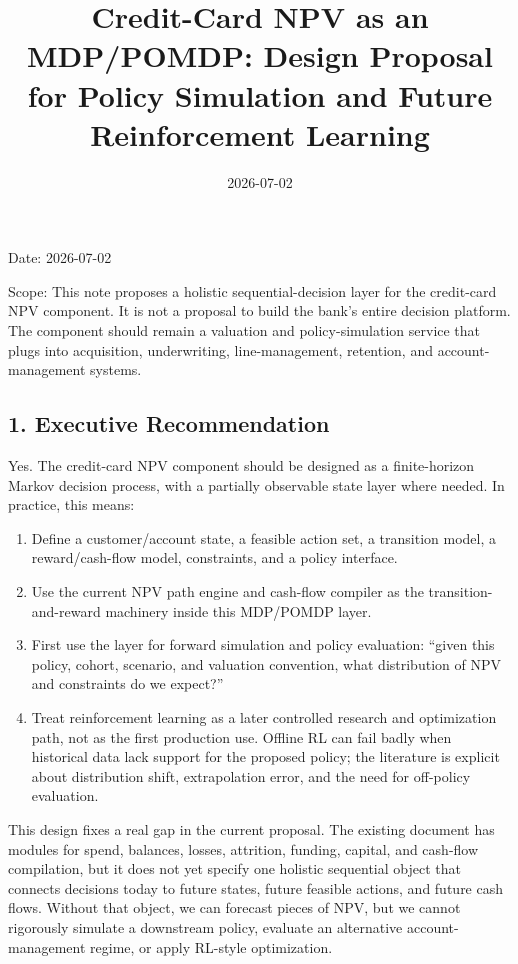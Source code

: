 \documentclass[
]{article}
\title{Credit-Card NPV as an MDP/POMDP: Design Proposal for Policy
Simulation and Future Reinforcement Learning}
\author{}
\date{2026-07-02}
\providecommand{\tightlist}{%
  \setlength{\itemsep}{0pt}\setlength{\parskip}{0pt}}
\begin{document}
\maketitle

Date: 2026-07-02

\tableofcontents
\newpage

Scope: This note proposes a holistic sequential-decision layer for the
credit-card NPV component. It is not a proposal to build the bank's
entire decision platform. The component should remain a valuation and
policy-simulation service that plugs into acquisition, underwriting,
line-management, retention, and account-management systems.

\hypertarget{executive-recommendation}{%
\subsection{1. Executive
Recommendation}\label{executive-recommendation}}

Yes. The credit-card NPV component should be designed as a
finite-horizon Markov decision process, with a partially observable
state layer where needed. In practice, this means:

\begin{enumerate}
\def\labelenumi{\arabic{enumi}.}
\tightlist
\item
  Define a customer/account state, a feasible action set, a transition
  model, a reward/cash-flow model, constraints, and a policy interface.
\item
  Use the current NPV path engine and cash-flow compiler as the
  transition-and-reward machinery inside this MDP/POMDP layer.
\item
  First use the layer for forward simulation and policy evaluation:
  ``given this policy, cohort, scenario, and valuation convention, what
  distribution of NPV and constraints do we expect?''
\item
  Treat reinforcement learning as a later controlled research and
  optimization path, not as the first production use. Offline RL can
  fail badly when historical data lack support for the proposed policy;
  the literature is explicit about distribution shift, extrapolation
  error, and the need for off-policy evaluation.
\end{enumerate}

This design fixes a real gap in the current proposal. The existing
document has modules for spend, balances, losses, attrition, funding,
capital, and cash-flow compilation, but it does not yet specify one
holistic sequential object that connects decisions today to future
states, future feasible actions, and future cash flows. Without that
object, we can forecast pieces of NPV, but we cannot rigorously simulate
a downstream policy, evaluate an alternative account-management regime,
or apply RL-style optimization.
\end{document}
